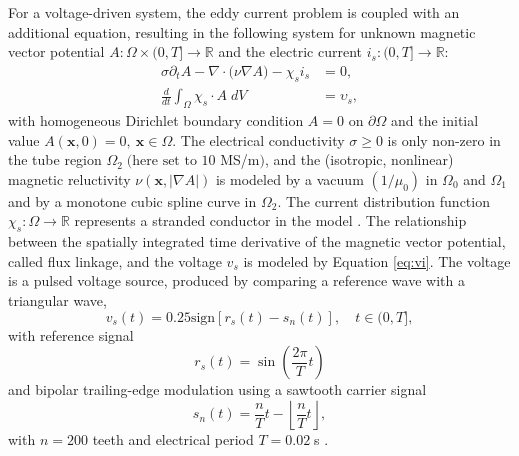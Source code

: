 \documentclass[VANCOUVER,STIX1COL]{WileyNJD-v2}
\begin{document}
For a voltage-driven system, the eddy current problem is coupled with an additional equation, resulting in the following system for unknown magnetic vector potential $A:\Omega\times (0, T] \to \mathbb{R}$ and the electric current $i_s: (0, T] \to \mathbb{R}$:
\begin{align}
\sigma \partial_t A - \nabla \cdot \big(\nu\nabla A) - \chi_{s} i_s &= 0, \label{eq:ecp} \\
\frac{d}{dt}\int_{\Omega} \chi_{s}\cdot A\; dV & = \upsilon_{s},\label{eq:vi}
\end{align}
with homogeneous Dirichlet boundary condition $A = 0$ on $\partial\Omega$ and the initial value $A(\mathbf{x}, 0) = 0, ~\mathbf{x}\in\Omega$. The electrical conductivity $ \sigma \geq 0$ is only non-zero in the tube region $\Omega_2 \; (\text{here set to } 10$ MS/m$)$, and the (isotropic, nonlinear) magnetic reluctivity $ \nu(\mathbf{x}, |\nabla A|)$ is modeled by a  vacuum $(1 / \mu_0)$ in $\Omega_0$ and $\Omega_1$ and by a monotone cubic spline curve in $\Omega_2$. The current distribution function $\chi_s: \Omega \rightarrow \mathbb{R}$ represents a stranded conductor in the model \cite{schoeps2013}. The relationship between the spatially integrated time derivative of the magnetic vector potential, called flux linkage, and the voltage $v_s$ is modeled by Equation \eqref{eq:vi}. The voltage is a pulsed voltage source, produced by comparing a reference wave with a triangular wave,
\[
    v_s(t) = 0.25\mathrm{sign}\left[r_s(t) - s_n(t)\right], \quad t\in (0,T],
\]
with reference signal
\[
    r_s(t) = \sin\left(\dfrac{2\pi}{T} t\right)
\]
and bipolar trailing-edge modulation using a sawtooth carrier signal
\[
    s_n(t) = \dfrac{n}{T}t - \left\lfloor\dfrac{n}{T}t\right\rfloor,
\]
with $n=200$ teeth and electrical period $T=0.02\;$s \cite{gander2019}. 
\end{document}
